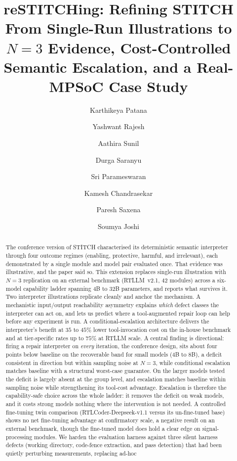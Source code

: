 \documentclass[11pt]{article}
\title{\textbf{reSTITCHing: Refining STITCH}\\[4pt]
\large\textnormal{From Single-Run Illustrations to $N{=}3$ Evidence,
Cost-Controlled Semantic Escalation, and a Real-MPSoC Case Study}}
\author{Karthikeya Patana \and Yashwant Rajesh \and Aathira Sunil \and Durga Saranyu \and Sri Parameswaran \and Kamesh Chandrasekar \and Paresh Saxena \and Soumya Joshi}
\date{}
\begin{document}
\maketitle

\begin{abstract}
The conference version of STITCH characterised its deterministic semantic
interpreter through four outcome regimes (enabling, protective, harmful, and
irrelevant), each demonstrated by a single module and model pair evaluated
once. That evidence was illustrative, and the paper said so. This extension
replaces single-run illustration with $N{=}3$ replication on an external
benchmark (RTLLM~v2.1, $42$ modules) across a six-model capability ladder
spanning $4$B to $32$B parameters, and reports what survives it. Two
interpreter illustrations replicate cleanly and anchor the mechanism. A
mechanistic input/output reachability asymmetry explains \emph{which} defect
classes the interpreter can act on, and lets us predict where a
tool-augmented repair loop can help before any experiment is run. A
conditional-escalation architecture delivers the interpreter's benefit at
$35$ to $45\%$ lower tool-invocation cost on the in-house benchmark and at
tier-specific rates up to $75\%$ at RTLLM scale. A central finding is
directional: firing a repair interpreter on \emph{every} iteration, the
conference design, sits about four points below baseline on the recoverable
band for small models ($4$B to $8$B), a deficit consistent in direction but
within sampling noise at $N{=}3$, while conditional escalation matches
baseline with a structural worst-case guarantee. On the larger models tested
the deficit is largely absent at the group level, and escalation matches
baseline within sampling noise while strengthening its tool-cost advantage.
Escalation is therefore the capability-safe choice across the whole ladder: it
removes the deficit on weak models, and it costs strong models nothing where
the intervention is not needed. A controlled fine-tuning twin comparison
(RTLCoder-Deepseek-v1.1 versus its un-fine-tuned base) shows no net
fine-tuning advantage at confirmatory scale, a negative result on an external
benchmark, though the fine-tuned model does hold a clear edge on
signal-processing modules. We harden the evaluation harness against three
silent harness defects (working directory, code-fence extraction, and pass
detection) that had been quietly perturbing measurements, replacing ad-hoc

\end{abstract}
\end{document}
